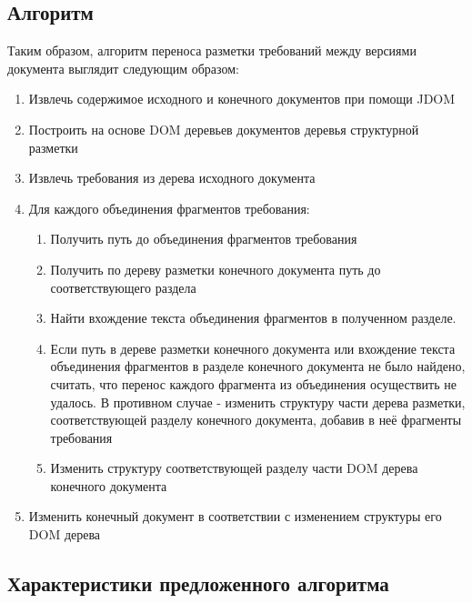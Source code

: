\subsection{Алгоритм}

Таким образом, алгоритм переноса разметки требований между версиями документа выглядит следующим образом:

\begin{enumerate}
\item Извлечь содержимое исходного и конечного документов при помощи JDOM

\item Построить на основе DOM деревьев документов деревья структурной разметки

\item Извлечь требования из дерева исходного документа

\item Для каждого объединения фрагментов требования:

\begin{enumerate}

\item Получить путь до объединения фрагментов требования

\item Получить по дереву разметки конечного документа путь до соответствующего раздела

\item Найти вхождение текста объединения фрагментов в полученном разделе.

\item Если путь в дереве разметки конечного документа или вхождение текста объединения фрагментов в разделе конечного документа не было найдено, считать, что перенос каждого фрагмента из объединения осуществить не удалось. В противном случае - изменить структуру части дерева разметки, соответствующей разделу конечного документа, добавив в неё фрагменты требования

\item Изменить структуру соответствующей разделу части DOM дерева конечного документа

\end{enumerate}

\item Изменить конечный документ в соответствии с изменением структуры его DOM дерева

\end{enumerate}

\subsection{Характеристики предложенного алгоритма}

